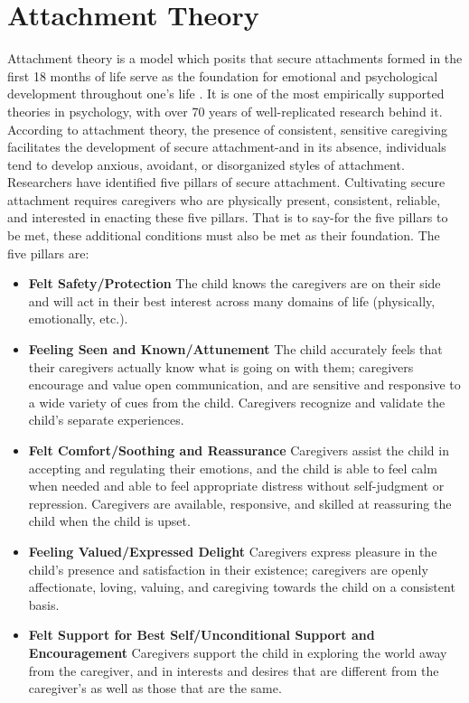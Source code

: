 \documentclass[12pt,letterpaper]{book}
\begin{document}
\chapter{Attachment Theory}
\label{attachment}
Attachment theory is a model which posits that secure attachments formed in the first 18 months of life serve as the foundation for emotional and psychological development throughout one's life \cite{brownAttachmentDisturbances}. It is one of the most empirically supported theories in psychology, with over 70 years of well-replicated research behind it. According to attachment theory, the presence of consistent, sensitive caregiving facilitates the development of secure attachment-and in its absence, individuals tend to develop anxious, avoidant, or disorganized styles of attachment. Researchers have identified five pillars of secure attachment. Cultivating secure attachment requires caregivers who are physically present, consistent, reliable, and interested in enacting these five pillars. That is to say-for the five pillars to be met, these additional conditions must also be met as their foundation. The five pillars are:

\begin{itemize}
    \item \textbf{Felt Safety/Protection} The child knows the caregivers are on their side and will act in their best interest across many domains of life (physically, emotionally, etc.).
    \item \textbf{Feeling Seen and Known/Attunement} The child accurately feels that their caregivers actually know what is going on with them; caregivers encourage and value open communication, and are sensitive and responsive to a wide variety of cues from the child. Caregivers recognize and validate the child's separate experiences.
    \item \textbf{Felt Comfort/Soothing and Reassurance} Caregivers assist the child in accepting and regulating their emotions, and the child is able to feel calm when needed and able to feel appropriate distress without self-judgment or repression. Caregivers are available, responsive, and skilled at reassuring the child when the child is upset.
    \item \textbf{Feeling Valued/Expressed Delight} Caregivers express pleasure in the child's presence and satisfaction in their existence; caregivers are openly affectionate, loving, valuing, and caregiving towards the child on a consistent basis.
    \item \textbf{Felt Support for Best Self/Unconditional Support and Encouragement} Caregivers support the child in exploring the world away from the caregiver, and in interests and desires that are different from the caregiver's as well as those that are the same.
\end{itemize}
\end{document}
